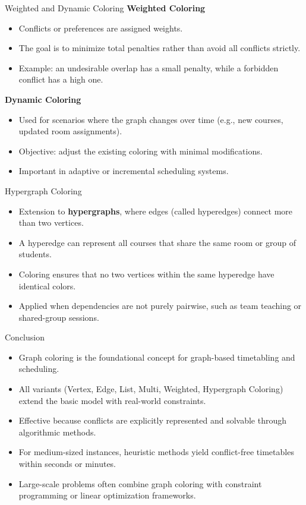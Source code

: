 \documentclass[10pt]{beamer}
\begin{document}
\begin{frame}{Weighted and Dynamic Coloring}
    \small
    \textbf{Weighted Coloring}
    \begin{itemize}
        \item Conflicts or preferences are assigned weights.
        \item The goal is to minimize total penalties rather than avoid all conflicts strictly.
        \item Example: an undesirable overlap has a small penalty, while a forbidden conflict has a high one.
    \end{itemize}

    \vspace{0.5em}
    \textbf{Dynamic Coloring}
    \begin{itemize}
        \item Used for scenarios where the graph changes over time (e.g., new courses, updated room assignments).
        \item Objective: adjust the existing coloring with minimal modifications.
        \item Important in adaptive or incremental scheduling systems.
    \end{itemize}
\end{frame}

\begin{frame}{Hypergraph Coloring}
    \small
    \begin{itemize}
        \item Extension to \textbf{hypergraphs}, where edges (called hyperedges) connect more than two vertices.
        \item A hyperedge can represent all courses that share the same room or group of students.
        \item Coloring ensures that no two vertices within the same hyperedge have identical colors.
        \item Applied when dependencies are not purely pairwise, such as team teaching or shared-group sessions.
    \end{itemize}
\end{frame}

\begin{frame}{Conclusion}
    \small
    \begin{itemize}
        \item Graph coloring is the foundational concept for graph-based timetabling and scheduling.
        \item All variants (Vertex, Edge, List, Multi, Weighted, Hypergraph Coloring) extend the basic model with real-world constraints.
        \item Effective because conflicts are explicitly represented and solvable through algorithmic methods.
        \item For medium-sized instances, heuristic methods yield conflict-free timetables within seconds or minutes.
        \item Large-scale problems often combine graph coloring with constraint programming or linear optimization frameworks.
    \end{itemize}
\end{frame}
\end{document}
